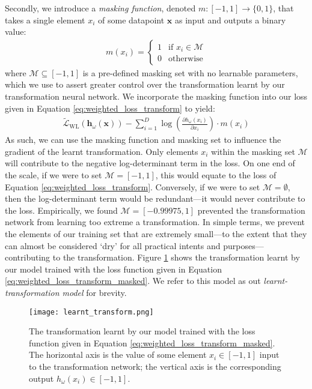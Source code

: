 \documentclass[ oneside,%
                    author={George Herbert},
                    degree={MSci},
                     title={Video Diffusion Models for Climate Simulations},
                  subtitle={}]{dissertation}
\begin{document}
Secondly, we introduce a \textit{masking function}, denoted $m:[-1,1]\to \{0,1\}$, that takes a single element $x_i$ of some datapoint $\mathbf{x}$ as input and outputs a binary value:
\begin{align}
      m(x_i)=\begin{cases}
            1 & \text{if } x_i\in \mathcal{M}\\
            0 & \text{otherwise}
      \end{cases}
\end{align}
where $\mathcal{M}\subseteq[-1, 1]$ is a pre-defined masking set with no learnable parameters, which we use to assert greater control over the transformation learnt by our transformation neural network. We incorporate the masking function into our loss given in Equation \ref{eq:weighted_loss_transform} to yield:
\begin{align}
      \tilde{\mathcal{L}}_{\mathrm{WL}}(\mathbf{h}_\omega(\mathbf{x})) - \sum_{i=1}^D \log \left(\frac{\partial h_\omega(x_i)}{\partial x_i}\right)\cdot m(x_i)\label{eq:weighted_loss_transform_masked}
\end{align}
As such, we can use the masking function and masking set to influence the gradient of the learnt transformation. Only elements $x_i$ within the masking set $\mathcal{M}$ will contribute to the negative log-determinant term in the loss. On one end of the scale, if we were to set $\mathcal{M}=[-1,1]$, this would equate to the loss of Equation \ref{eq:weighted_loss_transform}. Conversely, if we were to set $\mathcal{M}=\emptyset$, then the log-determinant term would be redundant---it would never contribute to the loss. Empirically, we found $\mathcal{M}=[-0.99975, 1]$ prevented the transformation network from learning too extreme a transformation. In simple terms, we prevent the elements of our training set that are extremely small---to the extent that they can almost be considered `dry' for all practical intents and purposes---contributing to the transformation. Figure \ref{fig:learnt_transform} shows the transformation learnt by our model trained with the loss function given in Equation \ref{eq:weighted_loss_transform_masked}. We refer to this model as out \textit{learnt-transformation model} for brevity.

\begin{figure}[htbp]
      \centering
      \texttt{[image: learnt\_transform.png]}
      \caption{The transformation learnt by our model trained with the loss function given in Equation \ref{eq:weighted_loss_transform_masked}. The horizontal axis is the value of some element $x_i\in[-1, 1]$ input to the transformation network; the vertical axis is the corresponding output $h_\omega(x_i)\in [-1, 1]$.}
      \label{fig:learnt_transform}
\end{figure}
\end{document}
